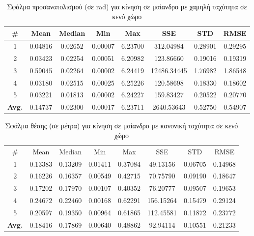 \begin{table}[H]
    \centering
    \caption{Σφάλμα προσανατολισμού (σε rad) για κίνηση σε μαίανδρο με χαμηλή ταχύτητα σε κενό χώρο}
    \label{tab:orientation_error_meander_slow_box}
    \begin{tabular}{| c | c | c | c | c | c | c | c | }
        \hline
        \rowcolor{Gray}
        \# & Mean & Median & Min & Max & SSE & STD & RMSE \\
        \hline
        1 & 0.04816 & 0.02652 & 0.00007 & 6.23700 & 312.04984 & 0.28901 & 0.29295 \\
        2 & 0.03423 & 0.02254 & 0.00051 & 6.20982 & 123.86660 & 0.19016 & 0.19319 \\
        3 & 0.59045 & 0.02264 & 0.00002 & 6.24419 & 12486.34445 & 1.76982 & 1.86548 \\
        4 & 0.03180 & 0.02515 & 0.00025 & 6.25226 & 120.58698 & 0.18330 & 0.18602 \\
        5 & 0.03221 & 0.01813 & 0.00002 & 6.24227 & 159.83427 & 0.20522 & 0.20770 \\
        \hline
        \textbf{Avg.} & 0.14737 & 0.02300 & 0.00017 & 6.23711 & 2640.53643 & 0.52750 & 0.54907 \\
        \hline
    \end{tabular}
\end{table}

\begin{table}[H]
    \begin{center}
        \centering
        \caption{Σφάλμα θέσης (σε μέτρα) για κίνηση σε μαίανδρο με κανονική ταχύτητα σε κενό χώρο}
        \label{tab:position_error_meander_normal_box}
        \begin{tabular}{| c | c | c | c | c | c | c | c | }
        \hline
        \rowcolor{Gray}
        \# & Mean & Median & Min & Max & SSE & STD & RMSE \\
        1 & 0.13383 & 0.13209 & 0.01411 & 0.37084 & 49.13156 & 0.06705 & 0.14968 \\
        2 & 0.16226 & 0.16357 & 0.00549 & 0.42715 & 70.75790 & 0.09190 & 0.18647 \\
        3 & 0.17202 & 0.17970 & 0.00107 & 0.40352 & 76.20777 & 0.09507 & 0.19653 \\
        4 & 0.24672 & 0.22460 & 0.00168 & 0.62291 & 156.15264 & 0.15479 & 0.29124 \\
        5 & 0.20597 & 0.19350 & 0.00964 & 0.61865 & 112.45581 & 0.11872 & 0.23772 \\
        \hline
        \textbf{Avg.} & 0.18416 & 0.17869 & 0.00640 & 0.48862 & 92.94114 & 0.10551 & 0.21233 \\
        \hline
        \end{tabular}
    \end{center}
\end{table}


